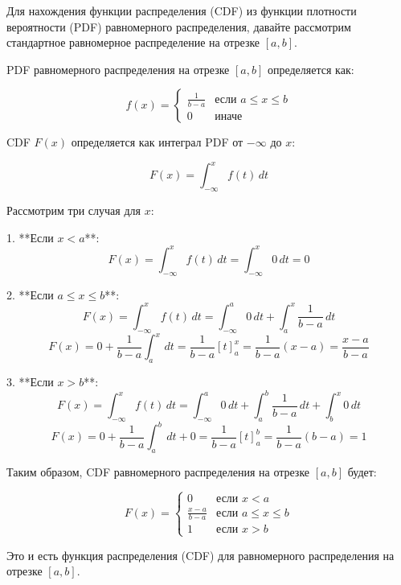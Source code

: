 \documentclass[a4paper, 14pt]{extarticle}
\begin{document}
\lstset{style=mystyle, extendedchars=\true}


Для нахождения функции распределения (CDF) из функции плотности вероятности (PDF) равномерного распределения, давайте рассмотрим стандартное равномерное распределение на отрезке \([a, b]\).

PDF равномерного распределения на отрезке \([a, b]\) определяется как:

\[ f(x) = \begin{cases}
\frac{1}{b-a} & \text{если } a \leq x \leq b \\
0 & \text{иначе}
\end{cases} \]

CDF \(F(x)\) определяется как интеграл PDF от \(-\infty\) до \(x\):

\[ F(x) = \int_{-\infty}^{x} f(t) \, dt \]

Рассмотрим три случая для \(x\):

1. **Если \(x < a\)**:
   \[ F(x) = \int_{-\infty}^{x} f(t) \, dt = \int_{-\infty}^{x} 0 \, dt = 0 \]

2. **Если \(a \leq x \leq b\)**:
   \[ F(x) = \int_{-\infty}^{x} f(t) \, dt = \int_{-\infty}^{a} 0 \, dt + \int_{a}^{x} \frac{1}{b-a} \, dt \]
   \[ F(x) = 0 + \frac{1}{b-a} \int_{a}^{x} \, dt = \frac{1}{b-a} [t]_{a}^{x} = \frac{1}{b-a} (x - a) = \frac{x - a}{b - a} \]

3. **Если \(x > b\)**:
   \[ F(x) = \int_{-\infty}^{x} f(t) \, dt = \int_{-\infty}^{a} 0 \, dt + \int_{a}^{b} \frac{1}{b-a} \, dt + \int_{b}^{x} 0 \, dt \]
   \[ F(x) = 0 + \frac{1}{b-a} \int_{a}^{b} \, dt + 0 = \frac{1}{b-a} [t]_{a}^{b} = \frac{1}{b-a} (b - a) = 1 \]

Таким образом, CDF равномерного распределения на отрезке \([a, b]\) будет:

\[ F(x) = \begin{cases}
0 & \text{если } x < a \\
\frac{x - a}{b - a} & \text{если } a \leq x \leq b \\
1 & \text{если } x > b
\end{cases} \]

Это и есть функция распределения (CDF) для равномерного распределения на отрезке \([a, b]\).
\end{document}
